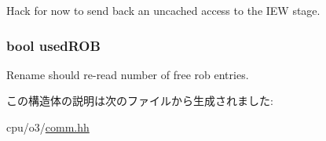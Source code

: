 Hack for now to send back an uncached access to the IEW stage. \hypertarget{structTimeBufStruct_1_1commitComm_a7947bc5bf9b7709eeb835c213e0d6c36}{
\subsubsection[{usedROB}]{\setlength{\rightskip}{0pt plus 5cm}bool {\bf usedROB}}}
\label{structTimeBufStruct_1_1commitComm_a7947bc5bf9b7709eeb835c213e0d6c36}


Rename should re-\/read number of free rob entries. 

この構造体の説明は次のファイルから生成されました:\begin{DoxyCompactItemize}
\item 
cpu/o3/\hyperlink{o3_2comm_8hh}{comm.hh}\end{DoxyCompactItemize}

